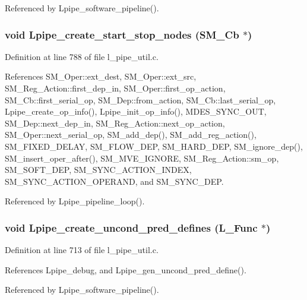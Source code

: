 Referenced by Lpipe\_\-software\_\-pipeline().
\subsubsection{\setlength{\rightskip}{0pt plus 5cm}void Lpipe\_\-create\_\-start\_\-stop\_\-nodes (\bf{SM\_\-Cb} $\ast$)}\label{l__pipe__util_8h_a967bed10a5deec4a8f2949828656c72}




Definition at line 788 of file l\_\-pipe\_\-util.c.

References SM\_\-Oper::ext\_\-dest, SM\_\-Oper::ext\_\-src, SM\_\-Reg\_\-Action::first\_\-dep\_\-in, SM\_\-Oper::first\_\-op\_\-action, SM\_\-Cb::first\_\-serial\_\-op, SM\_\-Dep::from\_\-action, SM\_\-Cb::last\_\-serial\_\-op, Lpipe\_\-create\_\-op\_\-info(), Lpipe\_\-init\_\-op\_\-info(), MDES\_\-SYNC\_\-OUT, SM\_\-Dep::next\_\-dep\_\-in, SM\_\-Reg\_\-Action::next\_\-op\_\-action, SM\_\-Oper::next\_\-serial\_\-op, SM\_\-add\_\-dep(), SM\_\-add\_\-reg\_\-action(), SM\_\-FIXED\_\-DELAY, SM\_\-FLOW\_\-DEP, SM\_\-HARD\_\-DEP, SM\_\-ignore\_\-dep(), SM\_\-insert\_\-oper\_\-after(), SM\_\-MVE\_\-IGNORE, SM\_\-Reg\_\-Action::sm\_\-op, SM\_\-SOFT\_\-DEP, SM\_\-SYNC\_\-ACTION\_\-INDEX, SM\_\-SYNC\_\-ACTION\_\-OPERAND, and SM\_\-SYNC\_\-DEP.

Referenced by Lpipe\_\-pipeline\_\-loop().
\subsubsection{\setlength{\rightskip}{0pt plus 5cm}void Lpipe\_\-create\_\-uncond\_\-pred\_\-defines (L\_\-Func $\ast$)}\label{l__pipe__util_8h_d5047dd886071898fb70d91fb6f80e99}




Definition at line 713 of file l\_\-pipe\_\-util.c.

References Lpipe\_\-debug, and Lpipe\_\-gen\_\-uncond\_\-pred\_\-define().

Referenced by Lpipe\_\-software\_\-pipeline().
